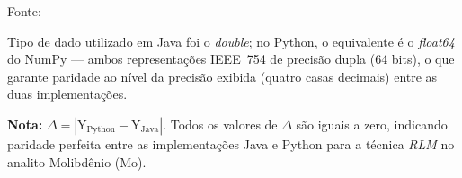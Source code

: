 \begin{table}[H]
\begin{threeparttable}
\begin{center}
\begin{minipage}{0.85\linewidth}
\begin{tablenotes}
\footnotesize
\item Fonte:~\oautor
\item[a] Tipo de dado utilizado em Java foi o \textit{double}; no Python,
o equivalente é o \textit{float64} do NumPy — ambos representações IEEE~754
de precisão dupla (64 bits), o que garante paridade ao nível da precisão exibida (quatro casas decimais) entre as
duas implementações.
\item \textbf{Nota:} $\Delta = |\text{Y}_{\text{Python}} - \text{Y}_{\text{Java}}|$.
Todos os valores de $\Delta$ são iguais a zero, indicando paridade
perfeita entre as implementações Java e Python para a técnica \textit{RLM}
no analito Molibdênio (Mo).
\end{tablenotes}
\end{minipage}
\end{center}
\end{threeparttable}
\end{table}

